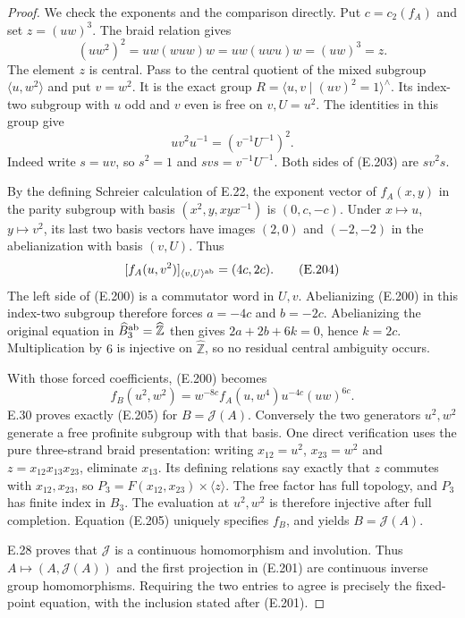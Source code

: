 \begin{proof}
We check the exponents and the comparison directly.  Put
$c=c_2(f_A)$ and set $z=(uw)^3$.  The braid relation gives
\[
 (uw^2)^2=uw(wuw)w=uw(uwu)w=(uw)^3=z.                       \tag{E.202}
\]
The element $z$ is central.  Pass to the central quotient
of the mixed subgroup $\langle u,w^2\rangle$ and put $v=w^2$.
It is the exact group
$R=\langle u,v\mid(uv)^2=1\rangle^{\wedge}$.
Its index-two subgroup with $u$ odd and $v$ even is free on
$v,U=u^2$.  The identities in this group give
\[
       uv^2u^{-1}=(v^{-1}U^{-1})^2.                         \tag{E.203}
\]
Indeed write $s=uv$, so $s^2=1$ and
$svs=v^{-1}U^{-1}$.  Both sides of (E.203) are $sv^2s$.

By the defining Schreier calculation of E.22, the exponent
vector of $f_A(x,y)$ in the parity subgroup with basis
$(x^2,y,xyx^{-1})$ is $(0,c,-c)$.  Under $x\mapsto u$,
$y\mapsto v^2$, its last two basis vectors have images
$(2,0)$ and $(-2,-2)$ in the abelianization with basis
$(v,U)$.  Thus
\[
       [f_A(u,v^2)]_{\langle v,U\rangle^{\rm ab}}
                         =(4c,2c).                          \tag{E.204}
\]
The left side of (E.200) is a commutator word in $U,v$.
Abelianizing (E.200) in this index-two subgroup therefore
forces $a=-4c$ and $b=-2c$.  Abelianizing the original
equation in $\widehat B_3^{\rm ab}=\widehat{\mathbb Z}$
then gives $2a+2b+6k=0$, hence $k=2c$.  Multiplication by
$6$ is injective on $\widehat{\mathbb Z}$, so no residual
central ambiguity occurs.

With those forced coefficients, (E.200) becomes
\[
 f_B(u^2,w^2)=w^{-8c}f_A(u,w^4)u^{-4c}(uw)^{6c}.             \tag{E.205}
\]
E.30 proves exactly (E.205) for $B=\mathcal J(A)$.
Conversely the two generators $u^2,w^2$ generate a free
profinite subgroup with that basis.  One direct verification
uses the pure three-strand braid presentation: writing
$x_{12}=u^2$, $x_{23}=w^2$ and
$z=x_{12}x_{13}x_{23}$, eliminate $x_{13}$.  Its defining
relations say exactly that $z$ commutes with $x_{12},x_{23}$,
so $P_3=F(x_{12},x_{23})\times\langle z\rangle$.
The free factor has full topology, and $P_3$ has finite
index in $B_3$.  The evaluation at $u^2,w^2$ is therefore
injective after full completion.  Equation (E.205) uniquely
specifies $f_B$, and yields $B=\mathcal J(A)$.

E.28 proves that $\mathcal J$ is a continuous homomorphism
and involution.  Thus $A\mapsto(A,\mathcal J(A))$ and the
first projection in (E.201) are continuous inverse group
homomorphisms.  Requiring the two entries to agree is
precisely the fixed-point equation, with the inclusion
stated after (E.201).


\end{proof}
